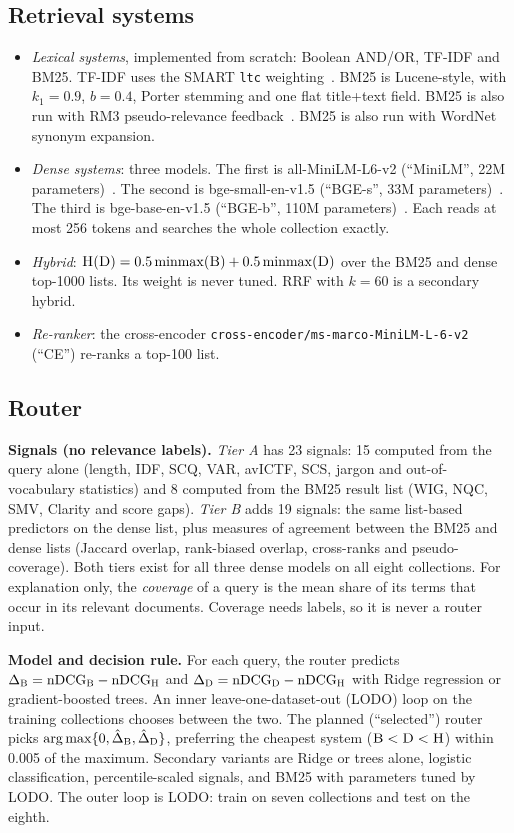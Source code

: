 \documentclass[conference]{IEEEtran}
\newcommand{\B}{\textsc{B}}
\newcommand{\Dn}{\textsc{D}}
\newcommand{\Hy}{\textsc{H}}
\begin{document}
\subsection{Retrieval systems}
\begin{itemize}
\item \emph{Lexical systems}, implemented from scratch: Boolean AND/OR, TF-IDF and BM25. TF-IDF uses the SMART \texttt{ltc} weighting~\cite{salton1988term}. BM25 is Lucene-style, with $k_1=0.9$, $b=0.4$, Porter stemming and one flat title+text field. BM25 is also run with RM3 pseudo-relevance feedback~\cite{lavrenko2001relevance}. BM25 is also run with WordNet synonym expansion.
\item \emph{Dense systems}: three models. The first is all-MiniLM-L6-v2 (``MiniLM'', 22M parameters)~\cite{reimers2019sbert}. The second is bge-small-en-v1.5 (``BGE-s'', 33M parameters)~\cite{xiao2024cpack}. The third is bge-base-en-v1.5 (``BGE-b'', 110M parameters)~\cite{hf_bgebase}. Each reads at most 256 tokens and searches the whole collection exactly.
\item \emph{Hybrid}: $\Hy(\Dn)=0.5\,\mathrm{minmax}(\B)+0.5\,\mathrm{minmax}(\Dn)$ over the BM25 and dense top-1000 lists. Its weight is never tuned. RRF with $k=60$ is a secondary hybrid.
\item \emph{Re-ranker}: the cross-encoder \texttt{cross-encoder/ms-marco-MiniLM-L-6-v2} (``CE'') re-ranks a top-100 list.
\end{itemize}

\subsection{Router}
\textbf{Signals (no relevance labels).} \emph{Tier A} has 23 signals: 15 computed from the query alone (length, IDF, SCQ, VAR, avICTF, SCS, jargon and out-of-vocabulary statistics) and 8 computed from the BM25 result list (WIG, NQC, SMV, Clarity and score gaps). \emph{Tier B} adds 19 signals: the same list-based predictors on the dense list, plus measures of agreement between the BM25 and dense lists (Jaccard overlap, rank-biased overlap, cross-ranks and pseudo-coverage). Both tiers exist for all three dense models on all eight collections. For explanation only, the \emph{coverage} of a query is the mean share of its terms that occur in its relevant documents. Coverage needs labels, so it is never a router input.

\textbf{Model and decision rule.} For each query, the router predicts $\Delta_\B=\mathrm{nDCG}_\B-\mathrm{nDCG}_\Hy$ and $\Delta_\Dn=\mathrm{nDCG}_\Dn-\mathrm{nDCG}_\Hy$ with Ridge regression or gradient-boosted trees. An inner leave-one-dataset-out (LODO) loop on the training collections chooses between the two. The planned (``selected'') router picks $\arg\max\{0,\hat\Delta_\B,\hat\Delta_\Dn\}$, preferring the cheapest system ($\B<\Dn<\Hy$) within 0.005 of the maximum. Secondary variants are Ridge or trees alone, logistic classification, percentile-scaled signals, and BM25 with parameters tuned by LODO. The outer loop is LODO: train on seven collections and test on the eighth.
\end{document}

